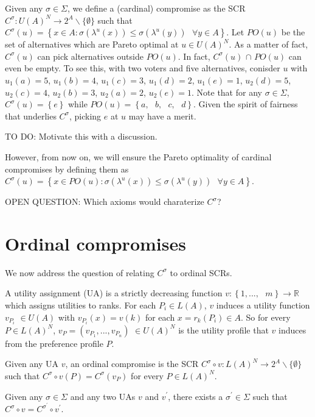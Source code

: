\documentclass[version=3.21, pagesize, notitlepage, twoside=off, bibliography=totoc, DIV=calc, fontsize=12pt, a4paper]{scrartcl}
\begin{document}
Given any $\sigma \in \Sigma $, we define a (cardinal) compromise as the SCR 
$C^{\sigma }:U(A)^{N}\rightarrow 2^{A}\backslash \{\emptyset \}$ such that $%
C^{\sigma }(u)=\left\{ x\in A:\sigma (\lambda ^{u}(x))\leq \sigma (\lambda
^{u}(y))\text{ }\forall y\in A\right\} $. Let $PO(u)$ be the set of
alternatives which are Pareto optimal at $u\in U(A)^{N}$. As a matter of
fact, $C^{\sigma }(u)$ can pick alternatives outside $PO(u)$. In fact, $%
C^{\sigma }(u)$ $\cap $ $PO(u)$ can even be empty. To see this, with two
voters and five alternatives, conisder $u$ with $u_{1}(a)=5$, $u_{1}(b)=4$, $%
u_{1}(c)=3$, $u_{1}(d)=2$, $u_{1}(e)=1$, $u_{2}(d)=5$, $u_{2}(c)=4$, $%
u_{2}(b)=3$, $u_{2}(a)=2$, $u_{2}(e)=1$. Note that for any $\sigma \in
\Sigma $, $C^{\sigma }(u)=\left\{ e\right\} $ while $PO(u)=\left\{ a,\text{ }%
b,\text{ }c,\text{ }d\right\} $. Given the spirit of fairness that underlies 
$C^{\sigma }$, picking $e$ at $u$ may have a merit. 

TO DO: Motivate this with a discussion.

However, from now on, we will ensure the Pareto optimality of cardinal
compromises by defining them as $C^{\sigma }(u)=\left\{ x\in PO(u):\sigma
(\lambda ^{u}(x))\leq \sigma (\lambda ^{u}(y))\text{ }\forall y\in A\right\} 
$.

OPEN QUESTION: Which axioms would charaterize $C^{\sigma }$?

\section{Ordinal compromises}

We now address the question of relating $C^{\sigma }$ to ordinal SCRs.

A utility assignment (UA) is a strictly decreasing function $v:\left\{ 1,...,%
\text{ }m\right\} \longrightarrow 
\mathbb{R}
$ which assigns utilities to ranks. For each $P_{i}\in L(A)$, $v$ induces a
utility function $v_{P_{i}}$ $\in U(A)$ with $v_{P_{i}}(x)=v(k)$ for each $%
x=r_{k}(P_{i})\in A$. So for every $P\in L(A)^{N}$, $%
v_{P}=(v_{P_{1}},...,v_{P_{n}})$ $\in U(A)^{N}$ is the utility profile that $%
v$ induces from the preference profile $P$.

Given any UA $v$, an ordinal compromise is the SCR $C^{\sigma }\circ
v:L(A)^{N}\rightarrow 2^{A}\backslash \{\emptyset \}$ such that $C^{\sigma
}\circ v(P)=C^{\sigma }(v_{P})$ for every $P\in L(A)^{N}$.

\begin{proposition}
\label{equivalence} Given any $\sigma \in \Sigma $ and any two UAs $v$ and $%
v^{\prime }$, there exists a $\sigma ^{\prime }\in \Sigma $ such that $%
C^{\sigma }\circ v=C^{\sigma ^{\prime }}\circ v^{\prime }$.
\end{proposition}
\end{document}
